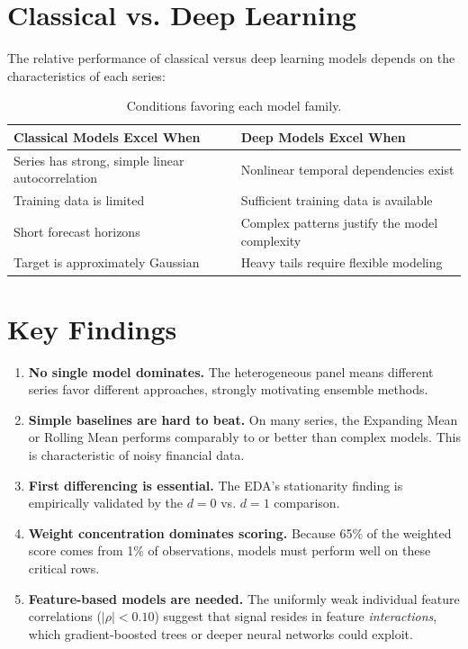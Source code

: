\section{Classical vs. Deep Learning}

The relative performance of classical versus deep learning models depends on the characteristics of each series:

\begin{table}[H]
\centering
\caption{Conditions favoring each model family.}
\begin{tabularx}{\textwidth}{>{\raggedright\arraybackslash}X>{\raggedright\arraybackslash}X}
\toprule
\textbf{Classical Models Excel When} & \textbf{Deep Models Excel When} \\
\midrule
Series has strong, simple linear autocorrelation & Nonlinear temporal dependencies exist \\
Training data is limited & Sufficient training data is available \\
Short forecast horizons & Complex patterns justify the model complexity \\
Target is approximately Gaussian & Heavy tails require flexible modeling \\
\bottomrule
\end{tabularx}
\end{table}

\section{Key Findings}

\begin{enumerate}
    \item \textbf{No single model dominates.} The heterogeneous panel means different series favor different approaches, strongly motivating ensemble methods.

    \item \textbf{Simple baselines are hard to beat.} On many series, the Expanding Mean or Rolling Mean performs comparably to or better than complex models. This is characteristic of noisy financial data.

    \item \textbf{First differencing is essential.} The EDA's stationarity finding is empirically validated by the $d=0$ vs. $d=1$ comparison.

    \item \textbf{Weight concentration dominates scoring.} Because 65\% of the weighted score comes from 1\% of observations, models must perform well on these critical rows.

    \item \textbf{Feature-based models are needed.} The uniformly weak individual feature correlations ($|\rho| < 0.10$) suggest that signal resides in feature \emph{interactions}, which gradient-boosted trees or deeper neural networks could exploit.
\end{enumerate}

